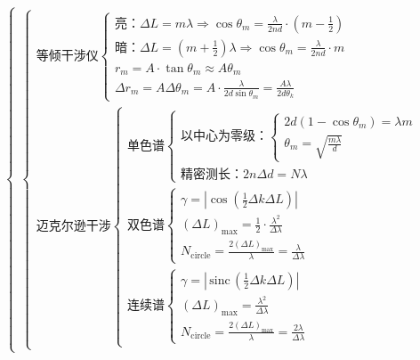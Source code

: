 \documentclass[UTF8]{report}
\def\sinc{\mathrm{\,sinc}\,}
\theoremstyle{MyLineTheoremStyle} %
\theoremstyle{MyBlockTheoremStyle} %
\theoremstyle{MySubsubsectionStyle} %
\begin{document}
\begin{align*}
\begin{cases}
    \begin{cases}
        \text{等倾干涉仪} 
        \begin{cases}
            \text{亮：}\Delta L = m\lambda \Longrightarrow \cos \theta_m = \frac{\lambda}{2nd}\cdot \left(m - \frac{1}{2}\right) \\ 
            \text{暗：}\Delta L = \left(m + \frac{1}{2}\right)\lambda  \Longrightarrow \cos \theta_m = \frac{\lambda}{2nd}\cdot m \\ 
            r_m = A \cdot \tan \theta_m \approx A \theta_m \\
            \Delta r_m = A \Delta \theta_m = A \cdot \frac{\lambda}{2d \sin \theta_m} = \frac{A\lambda}{2d \theta_k} 
        \end{cases}
        \\ \text{迈克尔逊干涉}
            \begin{cases}
                \text{单色谱}
                    \begin{cases}
                        \text{以中心为零级：} 
                        \begin{cases}
                            2d\left(1 - \cos \theta_m\right) = \lambda m\\ 
                            \theta_m = \sqrt{\frac{m\lambda}{d}}
                        \end{cases}\\ 
                        \text{精密测长：} 2 n \Delta d = N\lambda
                    \end{cases} 
                \\\text{双色谱} 
                    \begin{cases}
                        \gamma = \left| \cos \left(\frac{1}{2}\Delta k \Delta L\right) \right| \\ 
                        \left(\Delta L\right)_{\max} = \frac{1}{2}\cdot \frac{\lambda^2}{\Delta \lambda} \\ 
                        N_{\text{circle}} = \frac{2\left(\Delta L\right)_{\max}}{\lambda} =  \frac{\lambda}{\Delta \lambda}
                    \end{cases}
                \\\text{连续谱} 
                    \begin{cases}
                        \gamma = \left| \sinc \left(\frac{1}{2}\Delta k \Delta L\right) \right| \\ 
                        \left(\Delta L\right)_{\max} = \frac{\lambda^2}{\Delta \lambda} \\ 
                        N_{\text{circle}} = \frac{2\left(\Delta L\right)_{\max}}{\lambda} =  \frac{2\lambda}{\Delta \lambda}
                    \end{cases}
            \end{cases}
    \end{cases}
\end{cases}
\end{align*}
\end{document}
